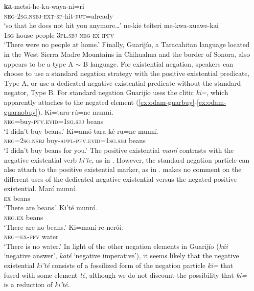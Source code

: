 \documentclass[output=paper,draft,draftmode,colorlinks,citecolor=brown]{langscibook}
\begin{document}
\gll \textbf{ka}-metsi-he-ku-waya-ni=ri\\
\textsc{neg-2sg.nsbj-ext-sp}-hit-\textsc{fut}=already\\
\glt ‘so that he does not hit you anymore…’ \citep[54]{bierge2017}
\z 
\ea
\label{ex:odam-notpeo}
\gll ne-kie teɨteri me-kwa-xuawe-kai\\
\textsc{1sg}-house people \textsc{3pl.sbj-neg-ex-ipfv}\\
\glt ‘There were no people at home.’ \citep[115]{bierge2017}
\z
Finally, Guarijío, a Taracahitan language located in the West Sierra Madre Mountains in Chihuahua and the border of Sonora, also appears to be a type A $\sim$ B language. For existential negation, speakers can choose to use a standard negation strategy with the positive existential predicate, Type A, or use a dedicated negative existential predicate without the standard negator, Type B. For standard negation Guarijío uses the clitic \emph{ki=}, which apparently attaches to the negated element (\ref{ex:odam-guarbuy}-\ref{ex:odam-guarnobuy}).
\ea
\label{ex:odam-guarbuy}
\gll Ki=tara-rú=ne			munní.\\
\textsc{neg}=buy-\textsc{pfv.evid=1sg.sbj}	beans\\
\glt ‘I didn’t buy beans.’ \citep[192]{armendariz2006}
\z 
\ea
\label{ex:odam-guarnobuy}
\gll Ki=amó	tara-ké-ru=ne			munní.\\
\textsc{neg=2sg.nsbj}	buy-\textsc{appl-pfv.evid=1sg.sbj}	beans\\
\glt ‘I didn’t buy beans for you.’ \citep[193]{armendariz2006}
\z 
The positive existential \emph{maní}  contrasts with the negative existential verb \emph{ki’te}, as in . However, the standard negation particle can also attach to the positive existential marker, as in . \citet{armendariz2006} makes no comment on the different uses of the dedicated negative existential versus the negated positive existential.
\ea
\label{ex:odam-guarbean}
\gll Maní	munní.\\
\textsc{ex} 	beans\\
\glt ‘There are beans.’ \citep[191]{armendariz2006}
\z 
\ea
\label{ex:odam-guarnobean}
\gll Ki’té		munní.\\
\textsc{neg.ex}	beans\\
\glt ‘There are no beans.’ \citep[192]{armendariz2006}
\z 
\ea
\label{ex:odam-guarwater}
\gll Ki=maní-re nerói.\\
\textsc{neg=ex-pfv} water\\
\glt `There is no water.' \citep[115]{armendariz2006}
\z
In light of the other negation elements in Guarijío (\emph{kái} `negative answer', \emph{katé} `negative imperative'), it seems likely that the negative existential \emph{ki’té} consists of a fossilized form of the negation particle \emph{ki=} that fused with some element \emph{té}, although we do not discount the possibility that \emph{ki=} is a reduction of \emph{ki'té}.
\end{document}
